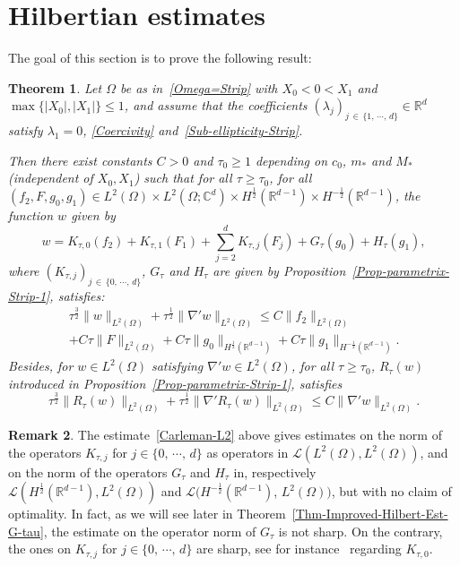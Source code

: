 \documentclass[10pt]{amsart}
\newtheorem{theo}{Theorem}[section]
\theoremstyle{definition}\newtheorem{defi}[theo]{Definition}\newtheorem{rema}[theo]{Remark}\newtheorem{exam}[theo]{Example}\newtheorem{exem}[theo]{Example}\newtheorem{nota}[theo]{Notation}
\newcommand{\scL}{\mathscr{L}}
\newcommand*\R{\mathbb{R}}
\newcommand*\C{\mathbb{C}}
\renewcommand{\leq}{\leqslant}
\renewcommand{\geq}{\geqslant}
\begin{document}
\section{Hilbertian estimates}\label{Sec-Hilbertian-est}

The goal of this section is to prove the following result:

\begin{theo}\label{Thm-Hilbertian-est}
Let $\Omega$ be as in~\eqref{Omega=Strip} with $X_0 \! <\! 0\! <\! X_1$ and $\max\{|X_0|, |X_1|\} \leq 1$, and assume that the coefficients $(\lambda_j)_{j\,\in\,\{1,\,\cdots,\,d\}} \in \R^d$ satisfy $\lambda_1 = 0$, \eqref{Coercivity} and~\eqref{Sub-ellipticity-Strip}.

Then there exist constants $C>0$ and $\tau_0 \geq 1$ depending on $c_0$, $m_*$ and $M_*$ (independent of $X_0, X_1$) such that for all $\tau \geq \tau_0$, for all $(f_2,F,g_0, g_1) \in L^2(\Omega) \times L^2(\Omega; \C^d) \times H^{\frac{1}{2}}(\R^{d-1})\times H^{-\frac{1}{2}}(\R^{d-1})$, the function $w$ given by
\begin{equation}\label{parametrix-f2_*=0}
w = K_{\tau,0} (f_2) + K_{\tau,1}(F_1) + \sum_{j = 2}^d K_{\tau,j} (F_j) + G_\tau(g_0) + H_\tau(g_1),
\end{equation}
where $(K_{\tau,j})_{j\,\in\,\{0,\,\cdots,\,d\} }$, $G_\tau$ and $H_\tau$ are given by Proposition~\ref{Prop-parametrix-Strip-1}, satisfies:
\begin{multline}\label{Carleman-L2}
\tau^{\frac{3}{2}} \| w \|_{L^2(\Omega)} + \tau^{\frac{1}{2}} \| \nabla' w \|_{L^2(\Omega)}
\leq C \| f_2 \|_{L^2(\Omega)}
\\
+ C\tau \| F\|_{L^2(\Omega)} + C \tau \| g_0 \|_{H^{\frac{1}{2}}\left(\R^{d-1}\right)} + C\tau \| g_1\|_{H^{-\frac{1}{2}}\left(\R^{d-1}\right)}.
\end{multline}
Besides, for $w \in L^2(\Omega)$ satisfying $\nabla' w \in L^2(\Omega)$, for all $\tau \geq \tau_0$, $R_\tau (w)$ introduced in Proposition~\ref{Prop-parametrix-Strip-1}, satisfies
\begin{equation}\label{Est-R-tau-L2}
\tau^{\frac{3}{2}} \| R_\tau (w) \|_{L^2(\Omega)} + \tau^{\frac{1}{2}} \| \nabla' R_\tau (w) \|_{L^2(\Omega)}
\leq C \| \nabla' w \|_{L^2(\Omega)}.
\end{equation}
\end{theo}

\begin{rema}
The estimate~\eqref{Carleman-L2} above gives estimates on the norm of the operators $K_{\tau,j}$ for $j \in \{0,\, \cdots,\,d\}$ as operators in $\scL(L^2(\Omega), L^2(\Omega))$, and on the norm of the operators $G_{\tau}$ and $H_\tau$ in, respectively $\scL(H^{\frac{1}{2}}(\R^{d-1}), L^2(\Omega))$ and $\scL(H^{-\frac{1}{2}}(\R^{d-1})$, $ L^2(\Omega))$, but with no claim of optimality. In fact, as we will see later in Theorem~\ref{Thm-Improved-Hilbert-Est-G-tau}, the estimate on the operator norm of $G_\tau$ is not sharp. On the contrary, the ones on $K_{\tau,j}$ for $j \in \{0,\,\cdots,\,d\}$ are sharp, see for instance~\cite[Part~1, Theorems~4.4, 4.5 and Theorem~4.10]{LeRousseaubookvolume1} regarding $K_{\tau,0}$.
\end{rema}
\end{document}
